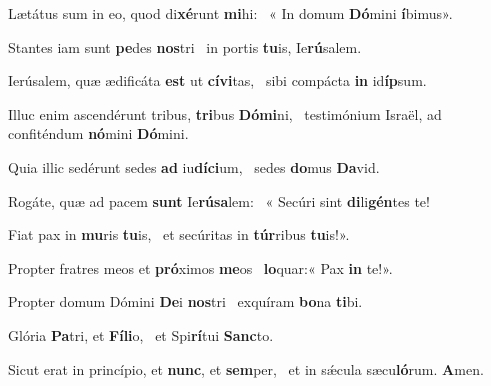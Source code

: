 \item Lætátus sum in eo, quod di\textbf{xé}runt \textbf{mi}hi:~\psstar{} « In domum \textbf{Dó}mini \textbf{í}bimus».

\item Stantes iam sunt \textbf{pe}des \textbf{nos}tri~\psstar{} in portis \textbf{tu}is, Ie\textbf{rú}salem.

\item Ierúsalem, quæ ædificáta \textbf{est} ut \textbf{cí}\textbf{vi}tas,~\psstar{} sibi compácta \textbf{in} id\textbf{íp}sum.

\item Illuc enim ascendérunt tribus, \textbf{tri}bus \textbf{Dó}\textbf{mi}ni,~\psstar{} testimónium Israël, ad confiténdum \textbf{nó}mini \textbf{Dó}mini.

\item Quia illic sedérunt sedes \textbf{ad} iu\textbf{dí}\textbf{ci}um,~\psstar{} sedes \textbf{do}mus \textbf{Da}vid.

\item Rogáte, quæ ad pacem \textbf{sunt} Ie\textbf{rú}\textbf{sa}lem:~\psstar{} « Secúri sint \textbf{di}li\textbf{gén}tes te!

\item Fiat pax in \textbf{mu}ris \textbf{tu}is,~\psstar{} et secúritas in \textbf{túr}ribus \textbf{tu}is!».

\item Propter fratres meos et \textbf{pró}ximos \textbf{me}os~\psstar{} \textbf{lo}quar:« Pax \textbf{in} te!».

\item Propter domum Dómini \textbf{De}i \textbf{nos}tri~\psstar{} exquíram \textbf{bo}na \textbf{ti}bi.

\item Glória \textbf{Pa}tri, et \textbf{Fí}\textbf{li}o,~\psstar{} et Spi\textbf{rí}tui \textbf{Sanc}to.

\item Sicut erat in princípio, et \textbf{nunc}, et \textbf{sem}per,~\psstar{} et in sǽcula sæcu\textbf{ló}rum. \textbf{A}men.
